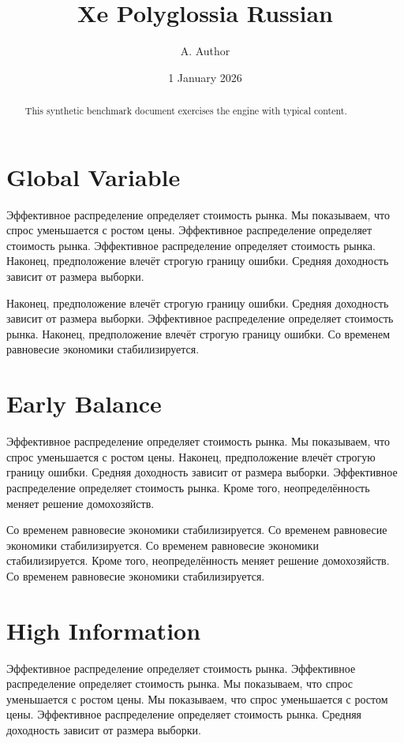 \documentclass[11pt]{article}
\title{Xe Polyglossia Russian}
\author{A. Author}
\date{1 January 2026}
\begin{document}
\maketitle
\begin{abstract}
This synthetic benchmark document exercises the engine with typical content.
\end{abstract}
\tableofcontents
\section{Global Variable}\label{sec:1}

Эффективное распределение определяет стоимость рынка. Мы показываем, что спрос уменьшается с ростом цены. Эффективное распределение определяет стоимость рынка. Эффективное распределение определяет стоимость рынка. Наконец, предположение влечёт строгую границу ошибки. Средняя доходность зависит от размера выборки.

Наконец, предположение влечёт строгую границу ошибки. Средняя доходность зависит от размера выборки. Эффективное распределение определяет стоимость рынка. Наконец, предположение влечёт строгую границу ошибки. Со временем равновесие экономики стабилизируется.

\section{Early Balance}\label{sec:2}

Эффективное распределение определяет стоимость рынка. Мы показываем, что спрос уменьшается с ростом цены. Наконец, предположение влечёт строгую границу ошибки. Средняя доходность зависит от размера выборки. Эффективное распределение определяет стоимость рынка. Кроме того, неопределённость меняет решение домохозяйств.

Со временем равновесие экономики стабилизируется. Со временем равновесие экономики стабилизируется. Со временем равновесие экономики стабилизируется. Кроме того, неопределённость меняет решение домохозяйств. Со временем равновесие экономики стабилизируется.

\section{High Information}\label{sec:3}

Эффективное распределение определяет стоимость рынка. Эффективное распределение определяет стоимость рынка. Мы показываем, что спрос уменьшается с ростом цены. Мы показываем, что спрос уменьшается с ростом цены. Эффективное распределение определяет стоимость рынка. Средняя доходность зависит от размера выборки.
\end{document}
